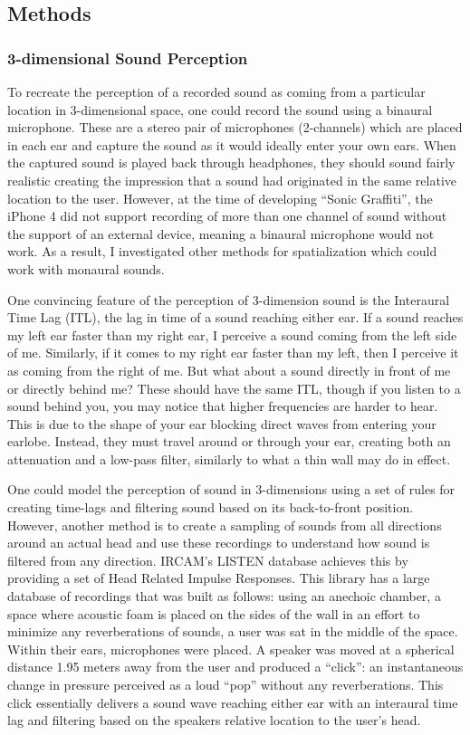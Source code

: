 \documentclass[a4paper,11pt,final]{ThesisStyle}
\begin{document}
\subsection{Methods}

\subsubsection{3-dimensional Sound Perception}\label{sec:binauralization}
To recreate the perception of a recorded sound as coming from a particular location in 3-dimensional space, one could record the sound using a binaural microphone.  These are a stereo pair of microphones (2-channels) which are placed in each ear and capture the sound as it would ideally enter your own ears.  When the captured sound is played back through headphones, they should sound fairly realistic creating the impression that a sound had originated in the same relative location to the user.  However, at the time of developing ``Sonic Graffiti'', the iPhone 4 did not support recording of more than one channel of sound without the support of an external device, meaning a binaural microphone would not work.  As a result, I investigated other methods for spatialization which could work with monaural sounds.

One convincing feature of the perception of 3-dimension sound is the Interaural Time Lag (ITL), the lag in time of a sound reaching either ear.  If a sound reaches my left ear faster than my right ear, I perceive a sound coming from the left side of me.  Similarly, if it comes to my right ear faster than my left, then I perceive it as coming from the right of me.  But what about a sound directly in front of me or directly behind me?  These should have the same ITL, though if you listen to a sound behind you, you may notice that higher frequencies are harder to hear.  This is due to the shape of your ear blocking direct waves from entering your earlobe.  Instead, they must travel around or through your ear, creating both an attenuation and a low-pass filter, similarly to what a thin wall may do in effect.  

One could model the perception of sound in 3-dimensions using a set of rules for creating time-lags and filtering sound based on its back-to-front position.  However, another method is to create a sampling of sounds from all directions around an actual head and use these recordings to understand how sound is filtered from any direction.  IRCAM's LISTEN database achieves this by providing a set of Head Related Impulse Responses.  This library has a large database of recordings that was built as follows: using an anechoic chamber, a space where acoustic foam is placed on the sides of the wall in an effort to minimize any reverberations of sounds, a user was sat in the middle of the space.  Within their ears, microphones were placed.  A speaker was moved at a spherical distance 1.95 meters away from the user and produced a ``click'': an instantaneous change in pressure perceived as a loud ``pop'' without any reverberations.  This click essentially delivers a sound wave reaching either ear with an interaural time lag and filtering based on the speakers relative location to the user's head.  
\end{document}
